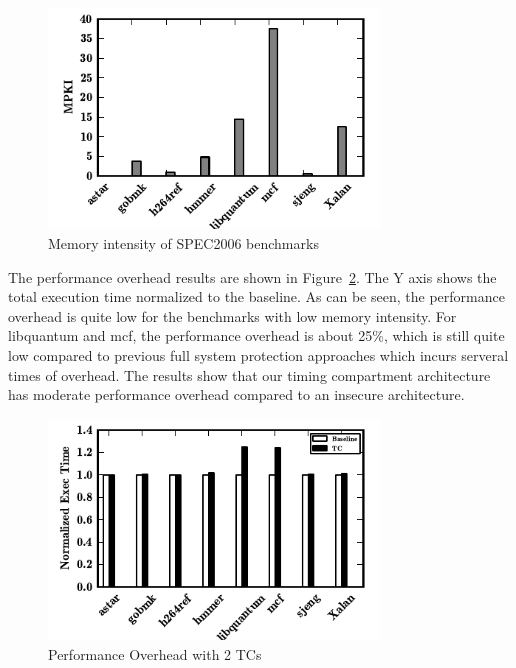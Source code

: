 \begin{figure}
    \begin{center}
        \includegraphics[width=3.46in]{figs/memstudy.pdf}
        \caption{Memory intensity of SPEC2006 benchmarks}
        \label{fig:memstudy}
    \end{center}
\end{figure}

The performance overhead results are shown in Figure~\ref{fig:performance}. The Y axis shows the total
execution time normalized to the baseline. As can be seen, the performance overhead is quite low
for the benchmarks with low memory intensity. For libquantum and mcf, the performance overhead is about 
25\%, which is still quite low compared to previous full system protection approaches which incurs serveral
times of overhead. The results show that our timing compartment architecture has moderate performance overhead
compared to an insecure architecture.

\begin{figure}
    \begin{center}
        \includegraphics[width=3.46in]{figs/performance.pdf}
        \caption{Performance Overhead with 2 TCs}
        \label{fig:performance}
    \end{center}
\end{figure}


